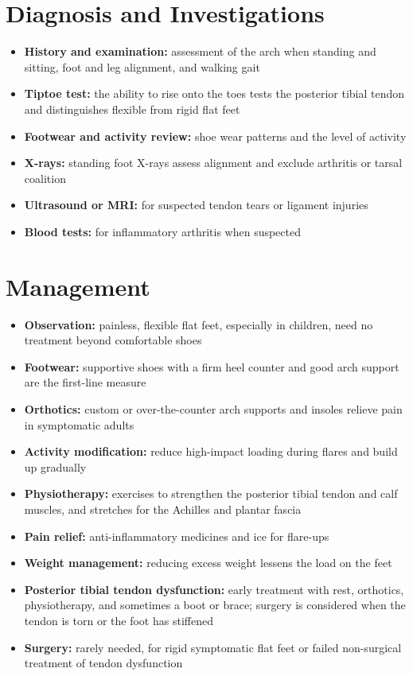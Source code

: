 \section*{Diagnosis and Investigations}
\begin{itemize}
    \item \textbf{History and examination:} assessment of the arch when standing and sitting, foot and leg alignment, and walking gait
    \item \textbf{Tiptoe test:} the ability to rise onto the toes tests the posterior tibial tendon and distinguishes flexible from rigid flat feet
    \item \textbf{Footwear and activity review:} shoe wear patterns and the level of activity
    \item \textbf{X-rays:} standing foot X-rays assess alignment and exclude arthritis or tarsal coalition
    \item \textbf{Ultrasound or MRI:} for suspected tendon tears or ligament injuries
    \item \textbf{Blood tests:} for inflammatory arthritis when suspected
\end{itemize}

\section*{Management}
\begin{itemize}
    \item \textbf{Observation:} painless, flexible flat feet, especially in children, need no treatment beyond comfortable shoes
    \item \textbf{Footwear:} supportive shoes with a firm heel counter and good arch support are the first-line measure
    \item \textbf{Orthotics:} custom or over-the-counter arch supports and insoles relieve pain in symptomatic adults
    \item \textbf{Activity modification:} reduce high-impact loading during flares and build up gradually
    \item \textbf{Physiotherapy:} exercises to strengthen the posterior tibial tendon and calf muscles, and stretches for the Achilles and plantar fascia
    \item \textbf{Pain relief:} anti-inflammatory medicines and ice for flare-ups
    \item \textbf{Weight management:} reducing excess weight lessens the load on the feet
    \item \textbf{Posterior tibial tendon dysfunction:} early treatment with rest, orthotics, physiotherapy, and sometimes a boot or brace; surgery is considered when the tendon is torn or the foot has stiffened
    \item \textbf{Surgery:} rarely needed, for rigid symptomatic flat feet or failed non-surgical treatment of tendon dysfunction
\end{itemize}

